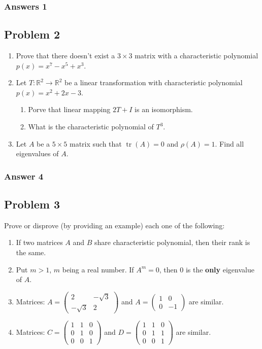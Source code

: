 \documentclass[fleqn]{article}
\DeclareMathOperator{\Trace}{tr}
\begin{document}
\subsubsection{Answers 1}
\label{sec-1-1-1}

\subsection{Problem 2}
\label{sec-1-2}
\begin{enumerate}
\item Prove that there doesn't exist a $3\times 3$ matrix with a characteristic
polynomial $p(x)=x^7-x^5+x^3$.
\item Let $T : \mathbb{R}^2 \to \mathbb{R}^2$ be a linear transformation with
characteristic polynomial $p(x)=x^2+2x-3$.
\begin{enumerate}
\item Porve that linear mapping $2T+I$ is an isomorphism.
\item What is the characteristic polynomial of $T^3$.
\end{enumerate}
\item Let $A$ be a $5 \times 5$ matrix such that $\Trace(A) = 0$ and $\rho(A)=1$.
Find all eigenvalues of $A$.
\end{enumerate}

\subsubsection{Answer 4}
\label{sec-1-2-1}
\subsection{Problem 3}
\label{sec-1-3}
Prove or disprove (by providing an example) each one of the following:
\begin{enumerate}
\item If two matrices $A$ and $B$ share characteristic polynomial, then their
rank is the same.
\item Put $m>1$, $m$ being a real number. If $A^m=0$, then 0 is the \textbf{only}
eigenvalue of $A$.
\item Matrices: $A=\begin{pmatrix}2 & -\sqrt{3} \\ -\sqrt{3} & 2\end{pmatrix}$
and $A=\begin{pmatrix}1 & 0 \\ 0 & -1\end{pmatrix}$ are similar.
\item Matrices: $C=\begin{pmatrix}1 & 1 & 0 \\ 0 & 1 & 0 \\ 0 & 0 & 1\end{pmatrix}$
and $D=\begin{pmatrix}1 & 1 & 0 \\ 0 & 1 & 1 \\ 0 & 0 & 1\end{pmatrix}$
are similar.
\end{enumerate}
\end{document}
